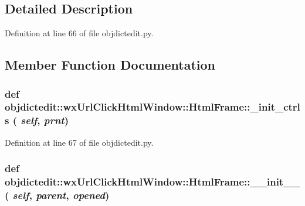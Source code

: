 \subsection{Detailed Description}




Definition at line 66 of file objdictedit.py.

\subsection{Member Function Documentation}
\hypertarget{classobjdictedit_1_1wxUrlClickHtmlWindow_1_1HtmlFrame_ab7f53a3b3ff1fd9cfe56023b159a40e}{
\subsubsection[\_\-init\_\-ctrls]{\setlength{\rightskip}{0pt plus 5cm}def objdictedit::wx\-Url\-Click\-Html\-Window::Html\-Frame::\_\-init\_\-ctrls ( {\em self},  {\em prnt})}}
\label{classobjdictedit_1_1wxUrlClickHtmlWindow_1_1HtmlFrame_ab7f53a3b3ff1fd9cfe56023b159a40e}




Definition at line 67 of file objdictedit.py.\hypertarget{classobjdictedit_1_1wxUrlClickHtmlWindow_1_1HtmlFrame_c3eab7be0bc1afb27171837c712da89d}{
\subsubsection[\_\-\_\-init\_\-\_\-]{\setlength{\rightskip}{0pt plus 5cm}def objdictedit::wx\-Url\-Click\-Html\-Window::Html\-Frame::\_\-\_\-init\_\-\_\- ( {\em self},  {\em parent},  {\em opened})}}
\label{classobjdictedit_1_1wxUrlClickHtmlWindow_1_1HtmlFrame_c3eab7be0bc1afb27171837c712da89d}




